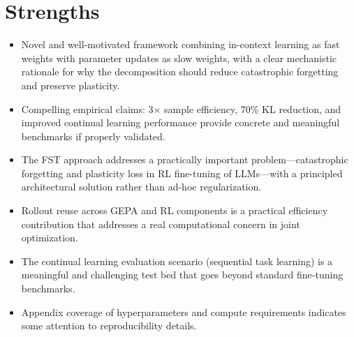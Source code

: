 \documentclass[11pt]{article}
\begin{document}
\section*{Strengths}
\begin{itemize}[leftmargin=*]
  \item Novel and well-motivated framework combining in-context learning as fast weights with parameter updates as slow weights, with a clear mechanistic rationale for why the decomposition should reduce catastrophic forgetting and preserve plasticity.
  \item Compelling empirical claims: 3× sample efficiency, 70\% KL reduction, and improved continual learning performance provide concrete and meaningful benchmarks if properly validated.
  \item The FST approach addresses a practically important problem—catastrophic forgetting and plasticity loss in RL fine-tuning of LLMs—with a principled architectural solution rather than ad-hoc regularization.
  \item Rollout reuse across GEPA and RL components is a practical efficiency contribution that addresses a real computational concern in joint optimization.
  \item The continual learning evaluation scenario (sequential task learning) is a meaningful and challenging test bed that goes beyond standard fine-tuning benchmarks.
  \item Appendix coverage of hyperparameters and compute requirements indicates some attention to reproducibility details.
\end{itemize}
\end{document}
